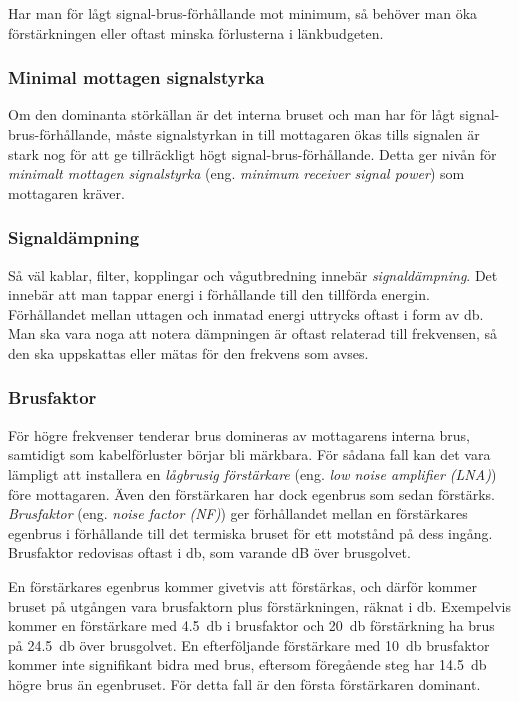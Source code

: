 Har man för lågt signal-brus-förhållande mot minimum, så behöver man öka
förstärkningen eller oftast minska förlusterna i länkbudgeten.

\newpage
\subsubsection{Minimal mottagen signalstyrka}

Om den dominanta störkällan är det interna bruset och man har för lågt
signal-brus-förhållande, måste signalstyrkan in till mottagaren ökas
tills signalen är stark nog för att ge tillräckligt högt
signal-brus-förhållande.
Detta ger nivån för \emph{minimalt mottagen signalstyrka} (eng.
\emph{minimum receiver signal power}) som mottagaren kräver.

\subsubsection{Signaldämpning}

Så väl kablar, filter, kopplingar och vågutbredning innebär
\emph{signaldämpning}.
Det innebär att man tappar energi i förhållande till den tillförda energin.
Förhållandet mellan uttagen och inmatad energi uttrycks oftast i form av
\unit{\decibel}.
Man ska vara noga att notera dämpningen är oftast relaterad till frekvensen,
så den ska uppskattas eller mätas för den frekvens som avses.

\subsubsection{Brusfaktor}
\label{brusfaktor}

För högre frekvenser tenderar brus domineras av mottagarens interna brus,
samtidigt som kabelförluster börjar bli märkbara.
För sådana fall kan det vara lämpligt att installera en
\emph{lågbrusig förstärkare} (eng. \emph{low noise amplifier (LNA)}) före
mottagaren.
Även den förstärkaren har dock egenbrus som sedan förstärks.
\emph{Brusfaktor} (eng. \emph{noise factor (NF)}) ger förhållandet mellan en
förstärkares egenbrus i förhållande till det termiska bruset för ett motstånd
på dess ingång.
Brusfaktor redovisas oftast i \unit{\decibel}, som varande dB över brusgolvet.

En förstärkares egenbrus kommer givetvis att förstärkas, och därför kommer
bruset på utgången vara brusfaktorn plus förstärkningen, räknat i \unit{\decibel}.
Exempelvis kommer en förstärkare med \qty{4,5}{\decibel} i brusfaktor och
\qty{20}{\decibel} förstärkning ha brus på \qty{24,5}{\decibel} över brusgolvet.
En efterföljande förstärkare med \qty{10}{\decibel} brusfaktor kommer inte
signifikant bidra med brus, eftersom föregående steg har \qty{14,5}{\decibel}
högre brus än egenbruset.
För detta fall är den första förstärkaren dominant.

